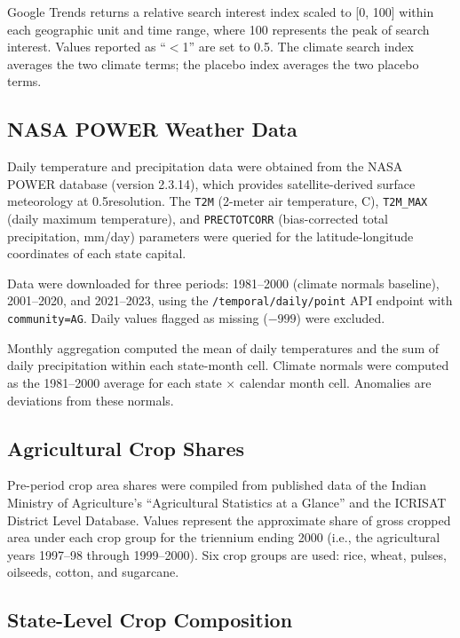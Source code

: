 \documentclass[12pt]{article}
\begin{document}
Google Trends returns a relative search interest index scaled to [0, 100] within each geographic unit and time range, where 100 represents the peak of search interest. Values reported as ``$<$1'' are set to 0.5. The climate search index averages the two climate terms; the placebo index averages the two placebo terms.

\subsection{NASA POWER Weather Data}

Daily temperature and precipitation data were obtained from the NASA POWER database (version 2.3.14), which provides satellite-derived surface meteorology at 0.5\degree resolution. The \texttt{T2M} (2-meter air temperature, \degree C), \texttt{T2M\_MAX} (daily maximum temperature), and \texttt{PRECTOTCORR} (bias-corrected total precipitation, mm/day) parameters were queried for the latitude-longitude coordinates of each state capital.

Data were downloaded for three periods: 1981--2000 (climate normals baseline), 2001--2020, and 2021--2023, using the \texttt{/temporal/daily/point} API endpoint with \texttt{community=AG}. Daily values flagged as missing ($-999$) were excluded.

Monthly aggregation computed the mean of daily temperatures and the sum of daily precipitation within each state-month cell. Climate normals were computed as the 1981--2000 average for each state $\times$ calendar month cell. Anomalies are deviations from these normals.

\subsection{Agricultural Crop Shares}

Pre-period crop area shares were compiled from published data of the Indian Ministry of Agriculture's ``Agricultural Statistics at a Glance'' and the ICRISAT District Level Database. Values represent the approximate share of gross cropped area under each crop group for the triennium ending 2000 (i.e., the agricultural years 1997--98 through 1999--2000). Six crop groups are used: rice, wheat, pulses, oilseeds, cotton, and sugarcane.

\subsection{State-Level Crop Composition}
\end{document}
